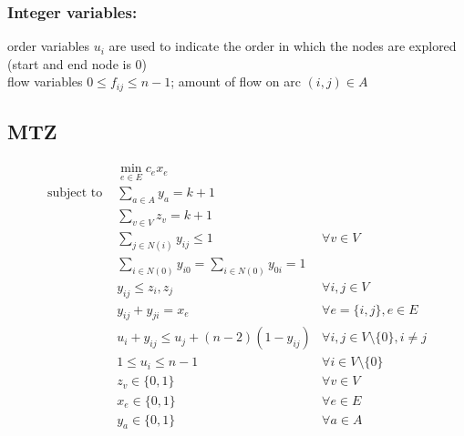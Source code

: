 \documentclass[11pt]{article}
\begin{document}
\subsubsection{Integer variables:}
order variables $u_i$ are used to indicate the order in which the nodes are explored (start and end node is 0) \\ 
flow variables $0 \leq f_{ij} \leq n-1$; amount of flow on arc $(i,j) \in A$

\subsection{MTZ}
\begin{subequations}
\begin{align}
 &\min_{e \in E} c_e x_e&  \\
\text{subject to }  &\sum_{a \in A} y_a = k+1& \\
 &\sum_{v \in V} z_v = k+1  \\
 &\sum_{j \in N(i)} y_{ij} \leq 1  & \forall v \in V \\
 & \sum_{i \in N(0)}y_{i0} = \sum_{i \in N(0)} y_{0i}  = 1  \\
 & y_{ij} \leq z_i, z_j & \forall i,j \in V \\
 & y_{ij} + y_{ji} = x_e & \forall e=\{i,j\}, e \in E \\
 & u_i + y_{ij} \leq u_j + (n-2)(1-y_{ij}) &\forall i,j \in V \setminus \{0\}, i \neq j \\
 & 1 \leq u_i \leq n-1 & \forall i \in V \setminus \{0\} \\
 & z_v \in \{0,1\} & \forall v \in V \\
 & x_e \in \{0,1\} & \forall e \in E \\
 & y_a \in \{0,1\} & \forall a \in A 
\end{align}
\end{subequations}
\end{document}
